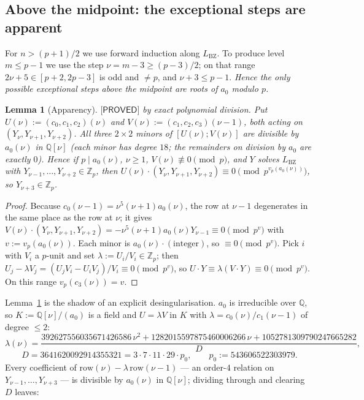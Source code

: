 \documentclass[11pt,reqno]{amsart}
\theoremstyle{plain}
\newtheorem{lemma}[theorem]{Lemma}
\theoremstyle{definition}
\theoremstyle{remark}
\numberwithin{equation}{section}
\newcommand{\ZZ}{\mathbb{Z}}
\newcommand{\QQ}{\mathbb{Q}}
\newcommand{\Zp}{\ZZ_p}
\newcommand{\LBZ}{L_{\mathrm{BZ}}}
\newcommand{\PROVED}{\textsf{[PROVED]}}
\begin{document}
\subsection{Above the midpoint: the exceptional steps are apparent}\label{sec:desing}

For $n>(p+1)/2$ we use forward induction along $\LBZ$. To produce level $m\le p-1$ we use the
step $\nu=m-3\ge(p-3)/2$; on that range $2\nu+5\in[p+2,2p-3]$ is odd and $\ne p$, and
$\nu+3\le p-1$. \emph{Hence the only possible exceptional steps above the midpoint are roots of
$a_0$ modulo $p$.}

\begin{lemma}[Apparency]\label{lem:APP}
$\PROVED$ by exact polynomial division. Put $U(\nu):=(c_0,c_1,c_2)(\nu)$ and
$V(\nu):=(c_1,c_2,c_3)(\nu-1)$, both acting on $(Y_\nu,Y_{\nu+1},Y_{\nu+2})$. All three
$2\times2$ minors of $[U(\nu);V(\nu)]$ are divisible by $a_0(\nu)$ in $\QQ[\nu]$ (each minor has
degree $18$; the remainders on division by $a_0$ are exactly $0$). Hence if $p\mid a_0(\nu)$,
$\nu\ge1$, $V(\nu)\not\equiv0\pmod p$, and $Y$ solves $\LBZ$ with
$Y_{\nu-1},\dots,Y_{\nu+2}\in\Zp$, then $U(\nu)\cdot(Y_\nu,Y_{\nu+1},Y_{\nu+2})\equiv0
\pmod{p^{v_p(a_0(\nu))}}$, so $Y_{\nu+3}\in\Zp$.
\end{lemma}

\begin{proof}
Because $c_0(\nu-1)=\nu^5(\nu+1)a_0(\nu)$, the row at $\nu-1$ degenerates in the same place as
the row at $\nu$; it gives $V(\nu)\cdot(Y_\nu,Y_{\nu+1},Y_{\nu+2})=-\nu^5(\nu+1)a_0(\nu)Y_{\nu-1}
\equiv0\pmod{p^v}$ with $v:=v_p(a_0(\nu))$. Each minor is $a_0(\nu)\cdot(\text{integer})$, so
$\equiv0\pmod{p^v}$. Pick $i$ with $V_i$ a $p$-unit and set $\lambda:=U_i/V_i\in\Zp$; then
$U_j-\lambda V_j=(U_jV_i-U_iV_j)/V_i\equiv0\pmod{p^v}$, so
$U\cdot Y\equiv\lambda(V\cdot Y)\equiv0\pmod{p^v}$. On this range $v_p(c_3(\nu))=v$.
\end{proof}

Lemma~\ref{lem:APP} is the shadow of an explicit desingularisation. $a_0$ is irreducible over
$\QQ$, so $K:=\QQ[\nu]/(a_0)$ is a field and $U=\lambda V$ in $K$ with
$\lambda=c_0(\nu)/c_1(\nu-1)$ of degree $\le2$:
\[
\lambda(\nu)=\frac{392627556035671426586\,\nu^2+1282015597875460006266\,\nu
+1052781309790247665282}{D},
\]
\[
D=3641620092914355321=3\cdot7\cdot11\cdot29\cdot p_0,\qquad p_0:=543606522303979 .
\]
Every coefficient of $\mathrm{row}(\nu)-\lambda\,\mathrm{row}(\nu-1)$ --- an order-$4$ relation
on $Y_{\nu-1},\dots,Y_{\nu+3}$ --- is divisible by $a_0(\nu)$ in $\QQ[\nu]$; dividing through
and clearing $D$ leaves:
\end{document}
